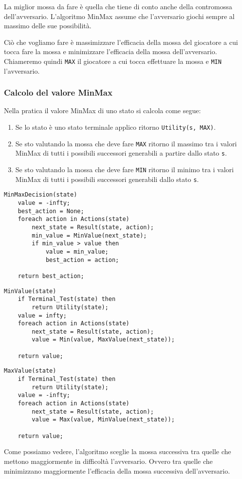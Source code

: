 La miglior mossa da fare \`e quella che tiene di conto anche della contromossa dell'avversario. L'algoritmo MinMax
assume che l'avversario giochi sempre al massimo delle sue possibilit\`a.

Ci\`o che vogliamo fare \`e massimizzare l'efficacia della mossa del giocatore a cui tocca fare la mossa e minimizzare
l'efficacia della mossa dell'avversario. Chiameremo quindi \verb|MAX| il giocatore a cui tocca effettuare la mossa
e \verb|MIN| l'avversario.

\subsubsection{Calcolo del valore MinMax}
Nella pratica il valore MinMax di uno stato si calcola come segue:
\begin{enumerate}
	\item Se lo stato \`e uno stato terminale applico ritorno \verb|Utility(s, MAX)|.
	\item Se sto valutando la mossa che deve fare \verb|MAX| ritorno il massimo tra i valori MinMax di tutti i possibili
	      successori generabili a partire dallo stato \verb|s|.
	\item Se sto valutando la mossa che deve fare \verb|MIN| ritorno il minimo tra i valori MinMax di tutti i possibili
	      successori generabili dallo stato \verb|s|.
\end{enumerate}

\begin{lstlisting}[style=pseudo-style]
MinMaxDecision(state)
	value = -infty;
	best_action = None;
	foreach action in Actions(state)
		next_state = Result(state, action);
		min_value = MinValue(next_state);
		if min_value > value then
			value = min_value;
			best_action = action;

	return best_action;
\end{lstlisting}

\begin{lstlisting}[style=pseudo-style]
MinValue(state)
	if Terminal_Test(state) then
		return Utility(state);
	value = infty;
	foreach action in Actions(state)
		next_state = Result(state, action);
		value = Min(value, MaxValue(next_state));
	
	return value;
\end{lstlisting}

\begin{lstlisting}[style=pseudo-style]
MaxValue(state)
	if Terminal_Test(state) then
		return Utility(state);
	value = -infty;
	foreach action in Actions(state)
		next_state = Result(state, action);
		value = Max(value, MinValue(next_state));
	
	return value;
\end{lstlisting}
Come possiamo vedere, l'algoritmo sceglie la mossa successiva tra quelle che mettono maggiormente in difficolt\`a
l'avversario. Ovvero tra quelle che minimizzano maggiormente l'efficacia della mossa successiva dell'avversario.

